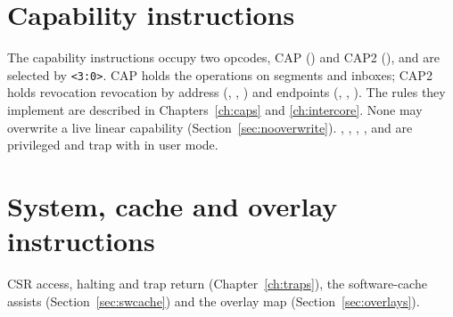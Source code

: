 \chapter{Capability instructions}\label{ch:i-cap}
The capability instructions occupy two opcodes, CAP () and CAP2 (), and are selected
by \texttt{<3:0>}. CAP holds the operations on segments and inboxes; CAP2 holds revocation
revocation by address (, , ) and endpoints (, ,
). The rules they implement are described in Chapters~\ref{ch:caps} and \ref{ch:intercore}.
None may overwrite a live linear capability (Section~\ref{sec:nooverwrite}). ,
, , ,  and  are privileged and trap with
 in user mode.



\chapter{System, cache and overlay instructions}\label{ch:i-sys}
CSR access, halting and trap return (Chapter~\ref{ch:traps}), the software-cache assists
(Section~\ref{sec:swcache}) and the overlay map (Section~\ref{sec:overlays}).


